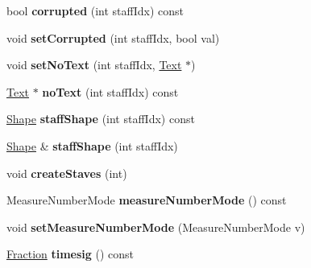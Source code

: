 \begin{DoxyCompactItemize}
\item 
\mbox{\label{class_ms_1_1_measure_a05f61e821fcc878e4442039f8170ac74}} 
bool {\bfseries corrupted} (int staff\+Idx) const
\item 
\mbox{\label{class_ms_1_1_measure_a08bbacc9d393f2e0d35f0adfd440a88d}} 
void {\bfseries set\+Corrupted} (int staff\+Idx, bool val)
\item 
\mbox{\label{class_ms_1_1_measure_aa7c76cc582915de6db1ff8856f19dc81}} 
void {\bfseries set\+No\+Text} (int staff\+Idx, \hyperlink{class_ms_1_1_text}{Text} $\ast$)
\item 
\mbox{\label{class_ms_1_1_measure_a18d62d7046f8cab1a06fbde8202da2a8}} 
\hyperlink{class_ms_1_1_text}{Text} $\ast$ {\bfseries no\+Text} (int staff\+Idx) const
\item 
\mbox{\label{class_ms_1_1_measure_a39b74f3eb26445303aeed9621b34c7bd}} 
\hyperlink{class_ms_1_1_shape}{Shape} {\bfseries staff\+Shape} (int staff\+Idx) const
\item 
\mbox{\label{class_ms_1_1_measure_a04ad93d5dc19ab47b2a0148c689087d6}} 
\hyperlink{class_ms_1_1_shape}{Shape} \& {\bfseries staff\+Shape} (int staff\+Idx)
\item 
\mbox{\label{class_ms_1_1_measure_a9e2273241416eec4c0b0b8c473d792d3}} 
void {\bfseries create\+Staves} (int)
\item 
\mbox{\label{class_ms_1_1_measure_ab70e232004b65f2e432cd2ec0e5631dd}} 
Measure\+Number\+Mode {\bfseries measure\+Number\+Mode} () const
\item 
\mbox{\label{class_ms_1_1_measure_a70c51bea207bfd73e61cbe36b9add89e}} 
void {\bfseries set\+Measure\+Number\+Mode} (Measure\+Number\+Mode v)
\item 
\mbox{\label{class_ms_1_1_measure_aca83bf67143934f224cd28aa7bdb4459}} 
\hyperlink{class_ms_1_1_fraction}{Fraction} {\bfseries timesig} () const
\item 

\end{DoxyCompactItemize}
